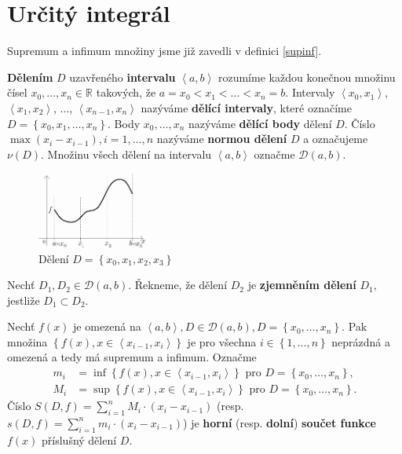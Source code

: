 \section{Určitý integrál}
\begin{pozn}
    Supremum a infimum množiny jsme již zavedli v definici \ref{supinf}.
\end{pozn}

\begin{definition}
\textbf{Dělením} $D$ uzavřeného \textbf{intervalu} $\left < a,b \right > $
rozumíme každou konečnou množinu čísel $x_0,\dots,x_n \in \mathbb R$ takových, že
$a=x_0<x_1<\dots<x_n=b.$ Intervaly $\left < x_0, x_1 \right >$,
$\left < x_1, x_2 \right >$, $\dots$, $\left < x_{n-1}, x_n \right >$ nazýváme
\textbf{dělící intervaly}, které označíme $D=\left \{ x_0,x_1,\dots,x_n \right \} .$
Body $x_0,\dots,x_n$ nazýváme \textbf{dělící body} dělení $D$. Číslo
$\max \left ( x_i-x_{i-1} \right ), i=1,\dots,n $ nazýváme \textbf{normou dělení}
$D$ a označujeme $\nu(D).$ Množinu všech dělení na intervalu $\left < a,b \right > $
označme $\mathscr D(a,b).$
\end{definition}

\begin{figure}[ht!]
  \centering
  \includegraphics[width=0.32\textwidth]{images/deleni.png}
  \caption{Dělení $D=\left \{ x_0, x_1, x_2, x_3 \right\}$}
\end{figure}

\begin{definition}
Nechť $D_1, D_2 \in \mathscr D(a,b)$. Řekneme, že dělení $D_2$ je \textbf{zjemněním
dělení} $D_1,$ jestliže $D_1 \subset D_2.$
\end{definition}

\begin{definition}
Nechť $f(x)$ je omezená na $\left < a,b \right > , D\in \mathscr D(a,b),
D=\left \{ x_0,\dots,x_n \right \}. $ Pak množina $\left \{ f(x),
x \in \left < x_{i-1},x_i \right >  \right \} $ je pro všechna $i \in \left \{
1,\dots,n\right \} $ neprázdná a omezená a tedy má supremum a infimum.
Označme
\begin{align*}
    m_i &= \inf \left \{ f(x), x \in \left < x_{i-1},x_i \right >  \right \} \textrm{ pro } D=\left \{ x_0,\dots,x_n \right \},\\
    M_i &=   \sup \left \{ f(x), x \in \left < x_{i-1},x_i \right >  \right \} \textrm{ pro } D=\left \{ x_0,\dots,x_n \right \}.
\end{align*}
Číslo $S(D,f)=\sum_{i=1}^n M_i\cdot (x_i-x_{i-1})$
(resp. $s(D,f)=\sum_{i=1}^n m_i\cdot (x_i-x_{i-1})$) je \textbf{horní} (resp. \textbf{dolní}) \textbf{součet funkce}
$f(x)$ příslušný dělení $D$.
\end{definition}

